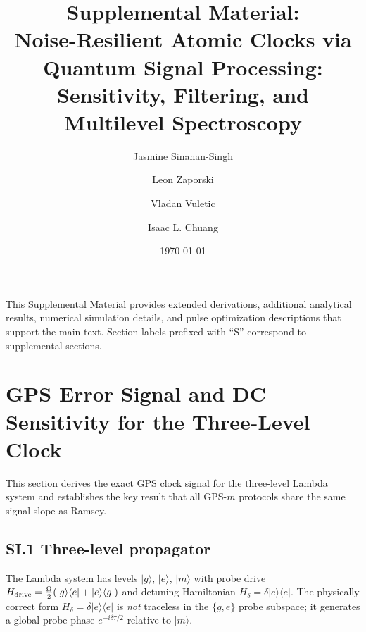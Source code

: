 \documentclass[aps,pra,twocolumn,superscriptaddress,longbibliography]{revtex4-2}
\begin{document}
\title{Supplemental Material:\\
Noise-Resilient Atomic Clocks via Quantum Signal Processing:\\
Sensitivity, Filtering, and Multilevel Spectroscopy}

\author{Jasmine Sinanan-Singh}
\author{Leon Zaporski}
\author{Vladan Vuletic}
\author{Isaac L. Chuang}

\date{\today}

\maketitle

This Supplemental Material provides extended derivations, additional analytical results,
numerical simulation details, and pulse optimization descriptions that support the main text.
Section labels prefixed with ``S'' correspond to supplemental sections.

\setcounter{section}{0}
\renewcommand{\thesection}{S\Roman{section}}
\renewcommand{\theequation}{S\arabic{equation}}
\setcounter{equation}{0}
\renewcommand{\thefigure}{S\arabic{figure}}
\setcounter{figure}{0}


\section{GPS Error Signal and DC Sensitivity for the Three-Level Clock}
\label{supp:gps_sensitivity}

This section derives the exact GPS clock signal for the three-level Lambda system
and establishes the key result that all GPS-$m$ protocols share the same signal slope as Ramsey.

\subsection*{SI.1 Three-level propagator}

The Lambda system has levels $|g\rangle$, $|e\rangle$, $|m\rangle$ with probe
drive $H_{\rm drive} = \tfrac{\Omega}{2}(|g\rangle\langle e|+|e\rangle\langle g|)$
and detuning Hamiltonian $H_\delta = \delta|e\rangle\langle e|$.
The physically correct form $H_\delta = \delta|e\rangle\langle e|$ is \emph{not}
traceless in the $\{g,e\}$ probe subspace; it generates a global probe phase
$e^{-i\delta\tau/2}$ relative to $|m\rangle$.
\end{document}
